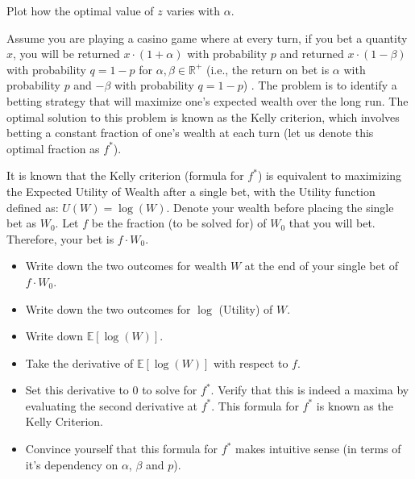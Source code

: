 \documentclass[12pt]{exam}
\begin{document}
\begin{questions}
Plot how the optimal value of $z$ varies with $\alpha$.


\question Assume you are playing a casino game where at every turn, if you bet a quantity $x$, you will be returned $x \cdot (1 + \alpha)$ with probability $p$ and returned $x \cdot (1 - \beta)$ with probability $q = 1 - p$ for $\alpha, \beta \in \mathbb{R}^+$ (i.e., the return on bet is $\alpha$ with probability $p$ and $-\beta$ with probability $q = 1-p$) . The problem is to identify a betting strategy that will maximize one's expected wealth over the long run. The optimal solution to this problem is known as the Kelly criterion, which involves betting a constant fraction of one's wealth at each turn (let us denote this optimal fraction as $f^*$).

It is known that the Kelly criterion (formula for $f^*$) is equivalent to maximizing the Expected Utility of Wealth after a single bet, with the Utility function defined as: $U(W) = \log(W)$. Denote your wealth before placing the single bet as $W_0$. Let $f$ be the fraction (to be solved for) of $W_0$ that you will bet. Therefore, your bet is $f \cdot W_0$.

\begin{itemize}
\item Write down the two outcomes for wealth $W$ at the end of your single bet of $f \cdot W_0$.
\item Write down the two outcomes for $\log$ (Utility) of $W$.
\item Write down $\mathbb{E}[\log(W)]$.
\item Take the derivative of $\mathbb{E}[\log(W)]$ with respect to $f$. 
\item Set this derivative to 0 to solve for $f^*$. Verify that this is indeed a maxima by evaluating the second derivative at $f^*$. This formula for $f^*$ is known as the Kelly Criterion. 
\item Convince yourself that this formula for $f^*$ makes intuitive sense (in terms of it's dependency on $\alpha$, $\beta$ and $p$).
\end{itemize}


\end{questions}
\end{document}
